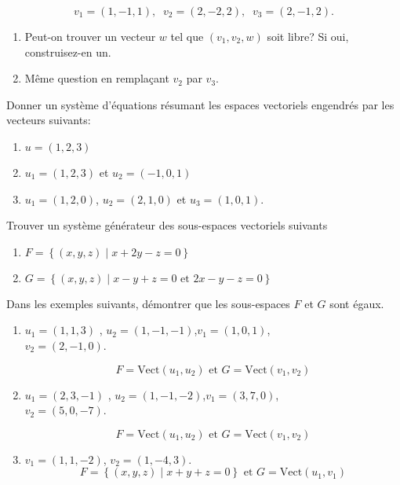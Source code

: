 \documentclass[10pt, a4paper, twocolumn]{homework}
\begin{document}
$$ v_1 = (1,-1,1), \;\; v_2=(2,-2,2),\;\; v_3=(2,-1,2).$$
\begin{enumerate}
  \item Peut-on trouver un vecteur $w$ tel que $(v_1, v_2, w)$ soit libre?
    Si oui, construisez-en un.
  \item Même question en remplaçant $v_2$ par $v_3$.
\end{enumerate}

Donner un système d'équations résumant les espaces vectoriels engendrés par les
vecteurs suivants:

\begin{enumerate}
  \item $u = (1,2,3)$
  \item $u_1 = (1,2,3)$ et $u_2=(-1,0,1)$
  \item $u_1=(1,2,0)$, $u_2=(2,1,0)$ et $u_3=(1,0,1)$.
\end{enumerate}
Trouver un système générateur des sous-espaces vectoriels suivants

\begin{enumerate}
  \item $F=\left\{(x,y,z)\;|\; x + 2y -z=0\right\}$
  \item $G = \left\{(x,y,z)\;|\; x-y+z=0 \text{ et } 2x-y-z=0\right\}$
\end{enumerate}

Dans les exemples suivants, démontrer que les sous-espaces $F$ et $G$ sont
égaux.

\begin{enumerate}
  \item $u_1=(1,1,3)$ , $u_2=(1,-1,-1)$,$v_1=(1,0,1)$, \\$v_2=(2,-1,0)$.

    $$
    F=\text{Vect}(u_1,u_2) \text{ et } G=\text{Vect}(v_1,v_2)
    $$

  \item $u_1=(2,3,-1)$ , $u_2=(1,-1,-2)$,$v_1=(3,7,0)$, \\$v_2=(5,0,-7)$.

    $$
    F=\text{Vect}(u_1,u_2) \text{ et } G=\text{Vect}(v_1,v_2)
    $$

  \item $v_1=(1,1,-2)$, $v_2=(1,-4,3)$.
    $$
    F=\left\{(x,y,z)\;|\; x+y+z=0\right\} \text{ et  }
    G=\text{Vect}(u_1,v_1)
    $$
\end{enumerate}
\end{document}
